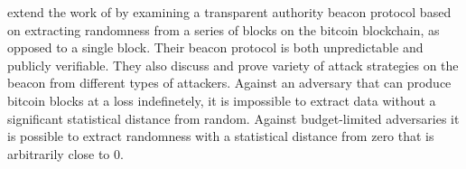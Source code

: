 \item[Bitcoin Beacon ($\pi_\text{beacon}$)] 
\citet{bentov2016bitcoin} extend the work of \cite{bonneau2015bitcoin} by examining a transparent authority beacon protocol based on extracting randomness from a series of blocks on the bitcoin blockchain, as opposed to a single block. Their beacon protocol is both unpredictable and publicly verifiable. They also discuss and prove variety of attack strategies on the beacon from different types of attackers. Against an adversary that can produce bitcoin blocks at a loss indefinetely, it is impossible to extract data without a significant statistical distance from random. Against budget-limited adversaries it is possible to extract randomness with a statistical distance from zero that is arbitrarily close to 0. 